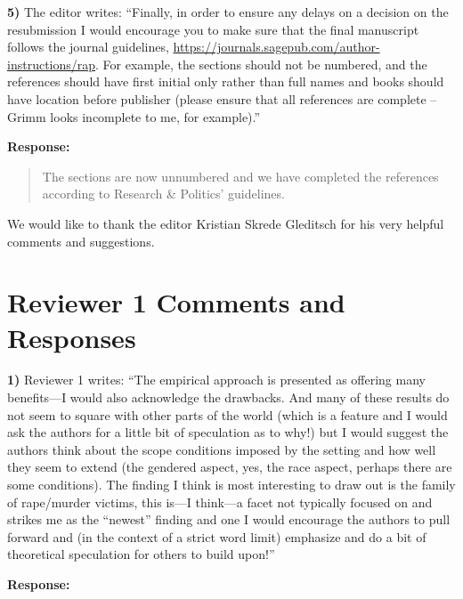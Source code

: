 \documentclass[a4paper,12pt]{article}
\begin{document}
\vspace{.3cm}

\noindent \textbf{5)} The editor writes: ``Finally, in order to ensure any
delays on a decision on the resubmission I would encourage you to make sure
that the final manuscript follows the journal guidelines,
\url{https://journals.sagepub.com/author-instructions/rap}. For example, the
sections should not be numbered, and the references should have first initial
only rather than full names and books should have location before publisher
(please ensure that all references are complete – Grimm looks incomplete to me,
for example).''

\noindent \textbf{Response:} 
\begin{quote}

The sections are now unnumbered and we have completed the references according
to Research \& Politics' guidelines.

\end{quote}

\vspace{.3cm}

We would like to thank the editor Kristian Skrede Gleditsch for his very
helpful comments and suggestions.

\section*{Reviewer 1 Comments and Responses}

\noindent \textbf{1)} Reviewer 1 writes: ``The empirical approach is presented
as offering many benefits---I would also acknowledge the drawbacks. And many of
these results do not seem to square with other parts of the world (which is a
feature and I would ask the authors for a little bit of speculation as to why!)
but I would suggest the authors think about the scope conditions imposed by the
setting and how well they seem to extend (the gendered aspect, yes, the race
aspect, perhaps there are some conditions). The finding I think is most
interesting to draw out is the family of rape/murder victims, this is—I think—a
facet not typically focused on and strikes me as the ``newest'' finding and one
I would encourage the authors to pull forward and (in the context of a strict
word limit) emphasize and do a bit of theoretical speculation for others to
build upon!''

\vspace{.3cm}

\noindent \textbf{Response:} 
\end{document}
